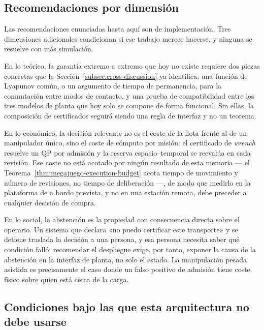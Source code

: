 \subsection{Recomendaciones por dimensión}
\label{subsec:conclusions-recommendations-dimensions}

Las recomendaciones enunciadas hasta aquí son de implementación. Tres
dimensiones adicionales condicionan si ese trabajo merece hacerse, y ninguna se
resuelve con más simulación.

En lo teórico, la garantía extremo a extremo que hoy no existe requiere dos
piezas concretas que la Sección~\ref{subsec:cross-discussion} ya
identifica: una función de Lyapunov común, o un argumento de tiempo de
permanencia, para la conmutación entre modos de contacto, y una prueba de
compatibilidad entre los tres modelos de planta que hoy solo se compone de
forma funcional. Sin ellas, la composición de certificados seguirá siendo una
regla de interfaz y no un teorema.

En lo económico, la decisión relevante no es el coste de la flota frente al de
un manipulador único, sino el coste de cómputo por misión: el certificado de
\emph{wrench} resuelve un QP por admisión y la reserva espacio--temporal se
reevalúa en cada revisión. Ese coste no está acotado por ningún resultado de
esta memoria --- el Teorema~\ref{thm:megajuego-execution-budget} acota tiempo
de movimiento y número de revisiones, no tiempo de deliberación ---, de modo
que medirlo en la plataforma de a bordo prevista, y no en una estación remota,
debe preceder a cualquier decisión de compra.

En lo social, la abstención es la propiedad con consecuencia directa sobre el
operario. Un sistema que declara «no puedo certificar este transporte» y se
detiene traslada la decisión a una persona, y esa persona necesita saber qué
condición falló; recomendar el despliegue exige, por tanto, exponer la causa de
la abstención en la interfaz de planta, no solo el estado. La manipulación
pesada asistida es precisamente el caso donde un falso positivo de admisión
tiene coste físico sobre quien está cerca de la carga.

\subsection{Condiciones bajo las que esta arquitectura no debe usarse}
\label{subsec:conclusions-do-not-use}

